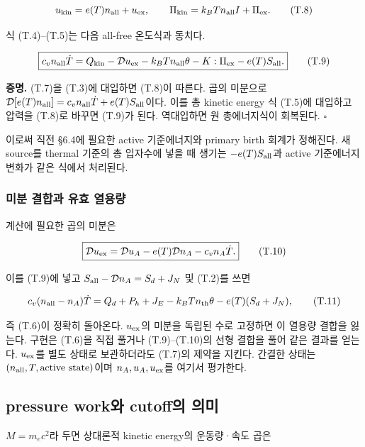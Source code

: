 \documentclass[11pt,a4paper]{article}
\begin{document}
\[
u_{\rm kin}=e(T)n_{\rm all}+u_{\rm ex},\qquad
\Pi_{\rm kin}=k_BTn_{\rm all}I+\Pi_{\rm ex}.
\tag{T.8}
\]

식 (T.4)--(T.5)는 다음 all-free 온도식과 동치다.

\[
\boxed{
c_vn_{\rm all}\dot T
=Q_{\rm kin}-\mathcal D u_{\rm ex}
-k_BTn_{\rm all}\theta-K:\Pi_{\rm ex}-e(T)S_{\rm all}.
}
\tag{T.9}
\]

\textbf{증명.} (T.7)을 (T.3)에 대입하면 (T.8)이 따른다. 곱의 미분으로 \(\mathcal D[e(T)n_{\rm all}] =c_vn_{\rm all}\dot T+e(T)S_{\rm all}\)이다. 이를 총 kinetic energy 식 (T.5)에 대입하고 압력을 (T.8)로 바꾸면 (T.9)가 된다. 역대입하면 원 총에너지식이 회복된다. \(\square\)

이로써 직전 §6.4에 필요한 active 기준에너지와 primary birth 회계가 정해진다. 새 source를 thermal 기준의 총 입자수에 넣을 때 생기는 \(-e(T)S_{\rm all}\)과 active 기준에너지 변화가 같은 식에서 처리된다.

\hypertarget{uxbbf8uxbd84-uxacb0uxd569uxacfc-uxc720uxd6a8-uxc5f4uxc6a9uxb7c9}{%
\subsubsection{미분 결합과 유효 열용량}\label{uxbbf8uxbd84-uxacb0uxd569uxacfc-uxc720uxd6a8-uxc5f4uxc6a9uxb7c9}}

계산에 필요한 곱의 미분은

\[
\boxed{\mathcal D u_{\rm ex}
=\mathcal D u_A-e(T)\mathcal D n_A-c_vn_A\dot T.}
\tag{T.10}
\]

이를 (T.9)에 넣고 \(S_{\rm all}-\mathcal Dn_A=S_d+J_N\) 및 (T.2)를 쓰면

\[
c_v(n_{\rm all}-n_A)\dot T
=Q_d+P_h+J_E-k_BTn_{\rm th}\theta-e(T)(S_d+J_N),
\tag{T.11}
\]

즉 (T.6)이 정확히 돌아온다. \(u_{\rm ex}\)의 미분을 독립된 수로 고정하면 이 열용량 결합을 잃는다. 구현은 (T.6)을 직접 풀거나 (T.9)--(T.10)의 선형 결합을 풀어 같은 결과를 얻는다. \(u_{\rm ex}\)를 별도 상태로 보관하더라도 (T.7)의 제약을 지킨다. 간결한 상태는 \((n_{\rm all},T,\text{active state})\)이며 \(n_A,u_A,u_{\rm ex}\)를 여기서 평가한다.

\hypertarget{pressure-workuxc640-cutoffuxc758-uxc758uxbbf8}{%
\subsection{pressure work와 cutoff의 의미}\label{pressure-workuxc640-cutoffuxc758-uxc758uxbbf8}}

\(M=m_ec^2\)라 두면 상대론적 kinetic energy의 운동량·속도 곱은
\end{document}
